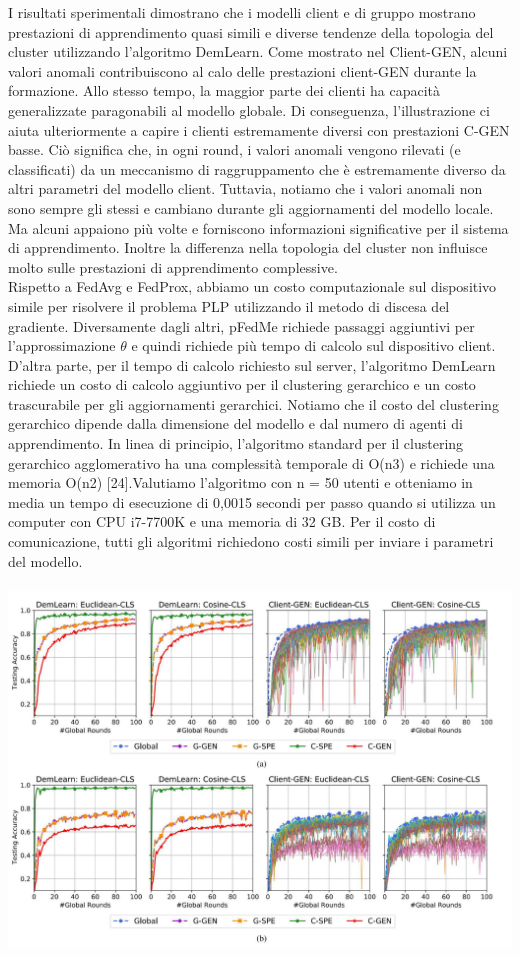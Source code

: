 I risultati sperimentali dimostrano che i modelli client e di gruppo mostrano prestazioni di apprendimento quasi simili e diverse tendenze della topologia del cluster utilizzando l'algoritmo DemLearn. Come mostrato nel Client-GEN, alcuni valori anomali contribuiscono al calo delle prestazioni client-GEN durante la formazione. Allo stesso tempo, la maggior parte dei clienti ha capacità generalizzate paragonabili al modello globale. Di conseguenza, l'illustrazione ci aiuta ulteriormente a capire i clienti estremamente diversi con prestazioni C-GEN basse. Ciò significa che, in ogni round, i valori anomali vengono rilevati (e classificati) da un meccanismo di raggruppamento che è estremamente diverso da altri parametri del modello client. Tuttavia, notiamo che i valori anomali non sono sempre gli stessi e cambiano durante gli aggiornamenti del modello locale. Ma alcuni appaiono più volte e forniscono informazioni significative per il sistema di apprendimento. Inoltre la differenza nella topologia del cluster non influisce molto sulle prestazioni di apprendimento complessive.\\
Rispetto a FedAvg e FedProx, abbiamo un costo computazionale sul dispositivo simile per risolvere il problema PLP utilizzando il metodo di discesa del gradiente. Diversamente dagli altri, pFedMe richiede passaggi aggiuntivi per l'approssimazione $\theta$ e quindi richiede più tempo di calcolo sul dispositivo client. D'altra parte, per il tempo di calcolo richiesto sul server, l'algoritmo DemLearn richiede un costo di calcolo aggiuntivo per il clustering gerarchico e un costo trascurabile per gli aggiornamenti gerarchici. Notiamo che il costo del clustering gerarchico dipende dalla dimensione del modello e dal numero di agenti di apprendimento. In linea di principio, l'algoritmo standard per il clustering gerarchico agglomerativo ha una complessità temporale di O(n3) e richiede una memoria O(n2) [24].Valutiamo l'algoritmo con n = 50 utenti e otteniamo in media un tempo di esecuzione di 0,0015 secondi per passo quando si utilizza un computer con CPU i7-7700K e una memoria di 32 GB. Per il costo di comunicazione, tutti gli algoritmi richiedono costi simili per inviare i parametri del modello.\\\\
\includegraphics[scale=0.4]{ClusteringLast}\\\\
